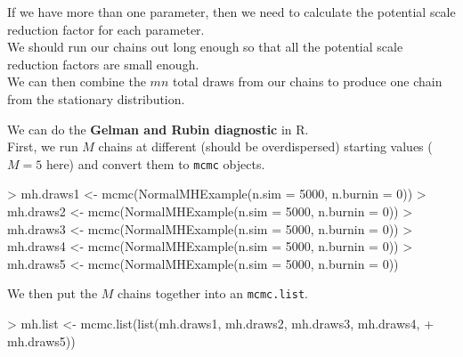 \documentclass[handout]{beamer}
\begin{document}
\begin{frame}
If we have more than one parameter, then we need to calculate the
potential scale reduction factor for each parameter.\\
\bigskip
\pause
We should run our chains out long enough so that all the potential
scale reduction factors are small enough.\\
\bigskip
\pause
We can then combine the $mn$ total draws from our chains to produce
one chain from the stationary distribution.
\end{frame}


\begin{frame}[fragile]
We can do the \textbf{Gelman and Rubin diagnostic} in R.\\
\bigskip
\pause
First, we run $M$ chains at different (should be overdispersed)
starting values ($M = 5$ here) and convert them to {\tt mcmc} objects.
\pause
\medskip
\tiny
\begin{Schunk}
\begin{Sinput}
> mh.draws1 <- mcmc(NormalMHExample(n.sim = 5000, n.burnin = 0))
> mh.draws2 <- mcmc(NormalMHExample(n.sim = 5000, n.burnin = 0))
> mh.draws3 <- mcmc(NormalMHExample(n.sim = 5000, n.burnin = 0))
> mh.draws4 <- mcmc(NormalMHExample(n.sim = 5000, n.burnin = 0))
> mh.draws5 <- mcmc(NormalMHExample(n.sim = 5000, n.burnin = 0))
\end{Sinput}
\end{Schunk}
\normalsize
\bigskip
\pause
We then put the $M$ chains together into an {\tt mcmc.list}.
\pause
\medskip
\tiny
\begin{Schunk}
\begin{Sinput}
> mh.list <- mcmc.list(list(mh.draws1, mh.draws2, mh.draws3, mh.draws4, 
+     mh.draws5))
\end{Sinput}
\end{Schunk}
\normalsize
\end{frame}
\end{document}
